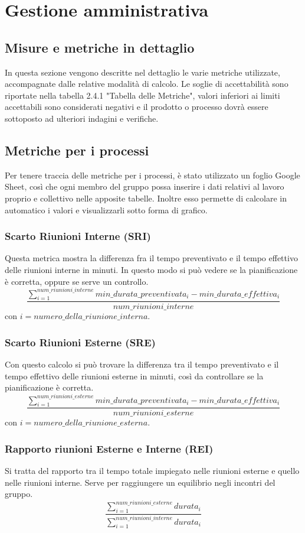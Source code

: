 \section{Gestione amministrativa}
\subsection{Misure e metriche in dettaglio}
In questa sezione vengono descritte nel dettaglio le varie metriche utilizzate, accompagnate dalle relative modalità di calcolo.
Le soglie di accettabilità sono riportate nella tabella 2.4.1 "Tabella delle Metriche", valori inferiori ai limiti accettabili sono considerati negativi e il prodotto o processo dovrà essere sottoposto ad ulteriori indagini e verifiche.
\subsection{Metriche per i processi}
Per tenere traccia delle metriche per i processi, è stato utilizzato un foglio Google Sheet, così che ogni membro del gruppo possa inserire i dati relativi al lavoro proprio e collettivo nelle apposite tabelle. Inoltre esso permette di calcolare in automatico i valori e visualizzarli sotto forma di grafico.

\subsubsection{Scarto Riunioni Interne (SRI)}
Questa metrica mostra la differenza fra il tempo preventivato e il tempo effettivo delle riunioni interne in minuti. In questo modo si può vedere se la pianificazione è corretta, oppure se serve un controllo.
\[\frac{\sum_{i=1}^{num\_riunioni\_interne}min\_durata\_preventivata_i-min\_durata\_effettiva_i}{num\_riunioni\_interne}\]
con $i = {numero\_della\_riunione\_interna}$.
\subsubsection{Scarto Riunioni Esterne (SRE)}
Con questo calcolo si può trovare la differenza tra il tempo preventivato e il tempo effettivo delle riunioni esterne in minuti, così da controllare se la pianificazione è corretta.
\[\frac{\sum_{i=1}^{num\_riunioni\_esterne}min\_durata\_preventivata_i-min\_durata\_effettiva_i}{num\_riunioni\_esterne}\]
con $i = {numero\_della\_riunione\_esterna}$.
\subsubsection{Rapporto riunioni Esterne e Interne (REI)}
Si tratta del rapporto tra il tempo totale impiegato nelle riunioni esterne e quello nelle riunioni interne. Serve per raggiungere un equilibrio negli incontri del gruppo.
\[\frac{\sum_{i=1}^{num\_riunioni\_esterne} durata_i}{\sum_{i=1}^{num\_riunioni\_interne} durata_i}\]

